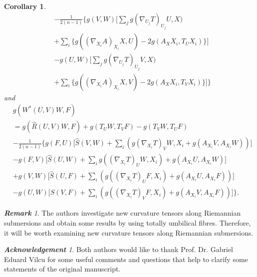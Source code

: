 \documentclass{birkjour}
\newtheorem{corollary}[theorem]{Corollary}
\theoremstyle{definition}
\theoremstyle{remark}
\newtheorem{rem}[theorem]{\bf{Remark}}
\newtheorem*{ack}{\bf{Acknowledgement}}
\numberwithin{equation}{section}
\begin{document}
\begin{corollary}
\begin{align*}
		& - \frac{1}{2(n-1)} \bigg\{g(V,W) \Big[\sum_{j} g(\nabla_{U_j}T)_{U_j}U,X)  \\
		&+ \sum_{i} \{g((\nabla_{X_i}A)_{X_i} X,U)-2g(A_X {X_i}, T_U X_i)\}\Big] \\
		&- g(U,W)  \Big[\sum_{j} g(\nabla_{U_j}T)_{U_j}V,X)  \\
		&+ \sum_{i} \{g((\nabla_{X_i}A)_{X_i} X,V)-2g(A_X {X_i}, T_V X_i)\}\Big] \bigg\}
	\end{align*}
	and
	\begin{align*}
		&g(W^* (U,V)W ,F)\\
		&=g(\hat{R} (U,V)W, F) + g(T_U W, T_V F) - g(T_V W, T_U F ) \\
		&- \frac{1}{2(n-1)} \bigg\{ g(F,U) \Big[ \hat{S}(V,W)
		+ \sum_{i}\left(g(\nabla_{X_i}T)_V W, {X_i}+ g(A_{X_i}V, A_{X_i}W)\right)  \Big] \\
		&-g(F,V) \Big[ \hat{S}(U,W) + \sum_{i} g((\nabla_{X_i}T)_U W, X_i)+ g(A_{X_i}U, A_{X_i}W) \Big]\\
		&+g(V,W) \Big[\hat{S}(U,F) + \sum_{i}\left(g((\nabla_{X_i}T)_U F, X_i)+g(A_{X_i}U,A_{X_i}F)\right)\Big]\\
		&-g(U,W) \Big[\hat{S}(V,F) + \sum_{i}\left(g((\nabla_{X_i}T)_V F, X_i)+ g(A_{X_i} V, A_{X_i}F)\right)\Big] \bigg\}.
	\end{align*}
\end{corollary}

\begin{rem}
	The authors investigate new curvature tensors along Riemannian submersions and obtain some results by using totally umbilical fibres.  Therefore, it will be worth examining new curvature tensors along Riemannian submersions. 
\end{rem}



\begin{ack}
Both authors would like to thank Prof. Dr. Gabriel Eduard Vilcu for some useful comments and questions that help to clarify some statements of the original manuscript.
\end{ack}
\end{document}
